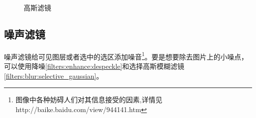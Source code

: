 \begin{figure}[!htbp]
	\centering
	\caption{高斯滤镜}
    	\label{filters:blur:gaussian:figure}
\end{figure}
\clearpage


\subsection{噪声滤镜}
噪声滤镜给可见图层或者选中的选区添加噪音\footnote{图像中各种妨碍人们对其信息接受的因素,详情见http://baike.baidu.com/view/944141.htm}。要是想要除去图片上的小噪点，可以使用降噪\ref{filters:enhance:despeckle}和选择高斯模糊滤镜\ref{filters:blur:selective_gaussian}。

